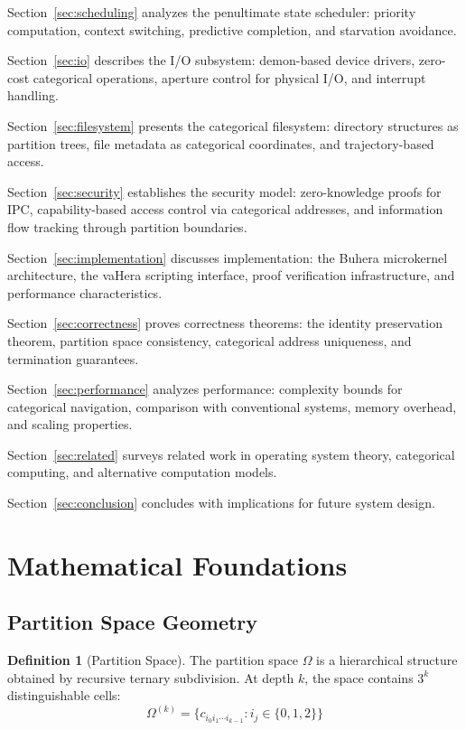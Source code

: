 \documentclass[twocolumn,10pt]{article}
\theoremstyle{definition}
\newtheorem{definition}[theorem]{Definition}
\theoremstyle{remark}
\begin{document}
Section~\ref{sec:scheduling} analyzes the penultimate state scheduler: priority computation, context switching, predictive completion, and starvation avoidance.

Section~\ref{sec:io} describes the I/O subsystem: demon-based device drivers, zero-cost categorical operations, aperture control for physical I/O, and interrupt handling.

Section~\ref{sec:filesystem} presents the categorical filesystem: directory structures as partition trees, file metadata as categorical coordinates, and trajectory-based access.

Section~\ref{sec:security} establishes the security model: zero-knowledge proofs for IPC, capability-based access control via categorical addresses, and information flow tracking through partition boundaries.

Section~\ref{sec:implementation} discusses implementation: the Buhera microkernel architecture, the vaHera scripting interface, proof verification infrastructure, and performance characteristics.

Section~\ref{sec:correctness} proves correctness theorems: the identity preservation theorem, partition space consistency, categorical address uniqueness, and termination guarantees.

Section~\ref{sec:performance} analyzes performance: complexity bounds for categorical navigation, comparison with conventional systems, memory overhead, and scaling properties.

Section~\ref{sec:related} surveys related work in operating system theory, categorical computing, and alternative computation models.

Section~\ref{sec:conclusion} concludes with implications for future system design.

\section{Mathematical Foundations}
\label{sec:foundations}

\subsection{Partition Space Geometry}

\begin{definition}[Partition Space]
The partition space $\Omega$ is a hierarchical structure obtained by recursive ternary subdivision. At depth $k$, the space contains $3^k$ distinguishable cells:
\begin{equation}
    \Omega^{(k)} = \{c_{i_0 i_1 \cdots i_{k-1}} : i_j \in \{0,1,2\}\}
\end{equation}
\end{definition}
\end{document}
